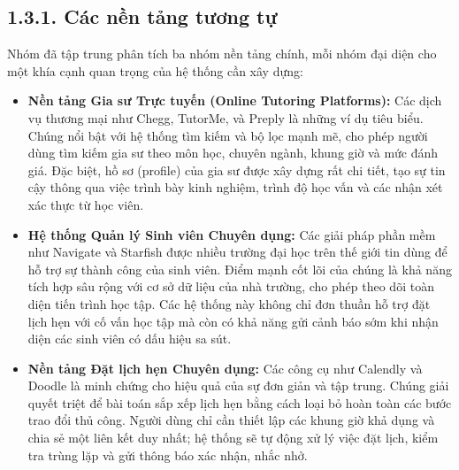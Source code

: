
\subsection*{1.3.1. Các nền tảng tương tự}
Nhóm đã tập trung phân tích ba nhóm nền tảng chính, mỗi nhóm đại diện cho một khía cạnh quan trọng của hệ thống cần xây dựng:

\begin{itemize}
    \item \textbf{Nền tảng Gia sư Trực tuyến (Online Tutoring Platforms):} Các dịch vụ thương mại như Chegg, TutorMe, và Preply là những ví dụ tiêu biểu. Chúng nổi bật với hệ thống tìm kiếm và bộ lọc mạnh mẽ, cho phép người dùng tìm kiếm gia sư theo môn học, chuyên ngành, khung giờ và mức đánh giá. Đặc biệt, hồ sơ (profile) của gia sư được xây dựng rất chi tiết, tạo sự tin cậy thông qua việc trình bày kinh nghiệm, trình độ học vấn và các nhận xét xác thực từ học viên.
    \item \textbf{Hệ thống Quản lý Sinh viên Chuyên dụng:} Các giải pháp phần mềm như Navigate và Starfish được nhiều trường đại học trên thế giới tin dùng để hỗ trợ sự thành công của sinh viên. Điểm mạnh cốt lõi của chúng là khả năng tích hợp sâu rộng với cơ sở dữ liệu của nhà trường, cho phép theo dõi toàn diện tiến trình học tập. Các hệ thống này không chỉ đơn thuần hỗ trợ đặt lịch hẹn với cố vấn học tập mà còn có khả năng gửi cảnh báo sớm khi nhận diện các sinh viên có dấu hiệu sa sút.
    \item \textbf{Nền tảng Đặt lịch hẹn Chuyên dụng:} Các công cụ như Calendly và Doodle là minh chứng cho hiệu quả của sự đơn giản và tập trung. Chúng giải quyết triệt để bài toán sắp xếp lịch hẹn bằng cách loại bỏ hoàn toàn các bước trao đổi thủ công. Người dùng chỉ cần thiết lập các khung giờ khả dụng và chia sẻ một liên kết duy nhất; hệ thống sẽ tự động xử lý việc đặt lịch, kiểm tra trùng lặp và gửi thông báo xác nhận, nhắc nhở.

\end{itemize}


